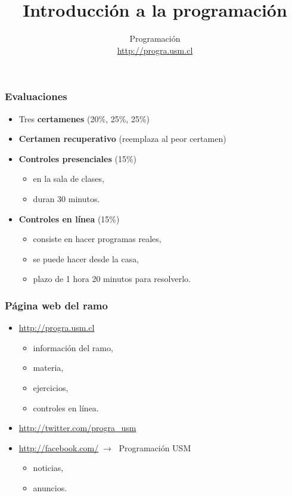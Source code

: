\documentclass[12pt]{beamer}
\title{Introducción a la programación}
\author{Programación \\ \url{http://progra.usm.cl}}
\date{}
\begin{document}
  \begin{frame}
    \maketitle
  \end{frame}

  \begin{frame}
    \frametitle{Evaluaciones}
    \label{evaluaciones}
    \begin{itemize}
      \item Tres \textbf{certamenes} (20\%, 25\%, 25\%)
      \item \textbf{Certamen recuperativo}
        (reemplaza al peor certamen)
      \vfill
      \item \textbf{Controles presenciales} (15\%)
        \begin{itemize}
          \item en la sala de clases,
          \item duran 30 minutos.
        \end{itemize}
      \vfill
      \item \textbf{Controles en línea} (15\%)
        \begin{itemize}
          \item consiste en hacer programas reales,
          \item se puede hacer desde la casa,
          \item plazo de 1 hora 20 minutos para resolverlo.
        \end{itemize}
    \end{itemize}
  \end{frame}

  \begin{frame}
    \frametitle{Página web del ramo}
    \label{web}
    \begin{itemize}
      \item \url{http://progra.usm.cl}
        \begin{itemize}
          \item información del ramo,
          \item materia,
          \item ejercicios,
          \item controles en línea.
        \end{itemize}
      \vfill
      \item \url{http://twitter.com/progra_usm}
      \item \url{http://facebook.com/}\(\;\rightarrow\;\) Programación USM
        \begin{itemize}
          \item noticias,
          \item anuncios.
        \end{itemize}
    \end{itemize}
  \end{frame}
\end{document}
